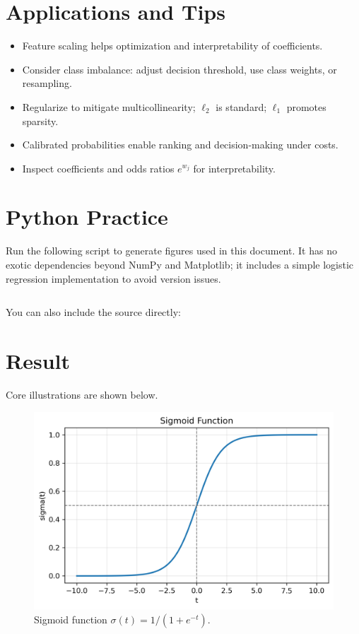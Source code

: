 \documentclass[11pt,a4paper]{article}
\begin{document}
\section{Applications and Tips}
\begin{itemize}
  \item Feature scaling helps optimization and interpretability of coefficients.
  \item Consider class imbalance: adjust decision threshold, use class weights, or resampling.
  \item Regularize to mitigate multicollinearity; $\ell_2$ is standard; $\ell_1$ promotes sparsity.
  \item Calibrated probabilities enable ranking and decision-making under costs.
  \item Inspect coefficients and odds ratios $e^{w_j}$ for interpretability.
\end{itemize}

\section{Python Practice}
Run the following script to generate figures used in this document. It has no exotic dependencies beyond NumPy and Matplotlib; it includes a simple logistic regression implementation to avoid version issues.
\begin{lstlisting}[style=code,caption={Python script to generate figures},label={lst:gen}]
\end{lstlisting}
You can also include the source directly:


\section{Result}
Core illustrations are shown below.

\begin{figure}[H]
  \centering
  \includegraphics[width=0.65\linewidth]{sigmoid_curve.png}
  \caption{Sigmoid function $\sigma(t)=1/(1+e^{-t})$.}
  \label{fig:sigmoid}
\end{figure}
\end{document}
